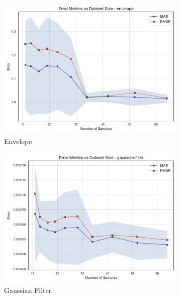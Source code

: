 \begin{figure}[htbp]
    \centering
    \begin{subfigure}[t]{0.32\textwidth}
        \includegraphics[width=\textwidth]{assets/images/05/residual_metrics_by_sample_size_envelope}
        \caption{Envelope}
    \end{subfigure}
    \hfill
    \begin{subfigure}[t]{0.32\textwidth}
        \includegraphics[width=\textwidth]{assets/images/05/residual_metrics_by_sample_size_gaussian-filter}
        \caption{Gaussian Filter}
    \end{subfigure}
    \hfill
    \begin{subfigure}[t]{0.32\textwidth}

\end{subfigure}
\end{figure}
